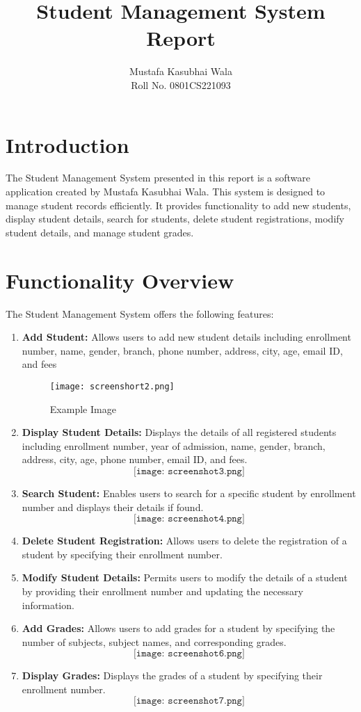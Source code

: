 \documentclass[a4paper,12pt]{article}
\title{Student Management System Report}
\author{Mustafa Kasubhai Wala\\Roll No. 0801CS221093}
\date{}
\begin{document}
\maketitle

\section*{Introduction}
The Student Management System presented in this report is a software application created by Mustafa Kasubhai Wala. This system is designed to manage student records efficiently. It provides functionality to add new students, display student details, search for students, delete student registrations, modify student details, and manage student grades.

\section*{Functionality Overview}
The Student Management System offers the following features:

\begin{enumerate}[label=\arabic*.]
    \item \textbf{Add Student:} Allows users to add new student details including enrollment number, name, gender, branch, phone number, address, city, age, email ID, and fees
    \begin{figure}[h]
    \centering
    \texttt{[image: screenshort2.png]}
    \caption{Example Image}
    \label{fig:example}
\end{figure}

    \item \textbf{Display Student Details:} Displays the details of all registered students including enrollment number, year of admission, name, gender, branch, address, city, age, phone number, email ID, and fees.
    \[
    \texttt{[image: screenshot3.png]}
    \]
    \item \textbf{Search Student:} Enables users to search for a specific student by enrollment number and displays their details if found.
    \[
    \texttt{[image: screenshot4.png]}
    \]
    \item \textbf{Delete Student Registration:} Allows users to delete the registration of a student by specifying their enrollment number.
    \item \textbf{Modify Student Details:} Permits users to modify the details of a student by providing their enrollment number and updating the necessary information.
    \item \textbf{Add Grades:} Allows users to add grades for a student by specifying the number of subjects, subject names, and corresponding grades.
    \[
    \texttt{[image: screenshot6.png]}
    \]
    \item \textbf{Display Grades:} Displays the grades of a student by specifying their enrollment number.
    \[
    \texttt{[image: screenshot7.png]}
    \]
\end{enumerate}
\end{document}
